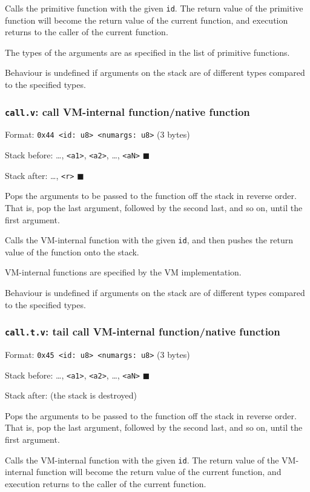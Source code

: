 Calls the primitive function with the given \texttt{id}. The return value of
the primitive function will become the return value of the current
function, and execution returns to the caller of the current function.

The types of the arguments are as specified in the list of primitive
functions.

Behaviour is undefined if arguments on the stack are of different types
compared to the specified types.

\subsubsection{\texttt{call.v}: call VM-internal function/native function}
\label{sec:org008ae6e}
Format: \texttt{0x44 <id: u8> <numargs: u8>} (3 bytes)

Stack before: \ldots{}, \texttt{<a1>}, \texttt{<a2>}, \ldots{}, \texttt{<aN>} \(\blacksquare\)

Stack after: \ldots{}, \texttt{<r>} \(\blacksquare\)

Pops the arguments to be passed to the function off the stack in reverse
order. That is, pop the last argument, followed by the second last, and
so on, until the first argument.

Calls the VM-internal function with the given \texttt{id}, and then pushes the
return value of the function onto the stack.

VM-internal functions are specified by the VM implementation.

Behaviour is undefined if arguments on the stack are of different types
compared to the specified types.

\subsubsection{\texttt{call.t.v}: tail call VM-internal function/native function}
\label{sec:org22cfce9}
Format: \texttt{0x45 <id: u8> <numargs: u8>} (3 bytes)

Stack before: \ldots{}, \texttt{<a1>}, \texttt{<a2>}, \ldots{}, \texttt{<aN>} \(\blacksquare\)

Stack after: (the stack is destroyed)

Pops the arguments to be passed to the function off the stack in reverse
order. That is, pop the last argument, followed by the second last, and
so on, until the first argument.

Calls the VM-internal function with the given \texttt{id}. The return value of
the VM-internal function will become the return value of the current
function, and execution returns to the caller of the current function.

